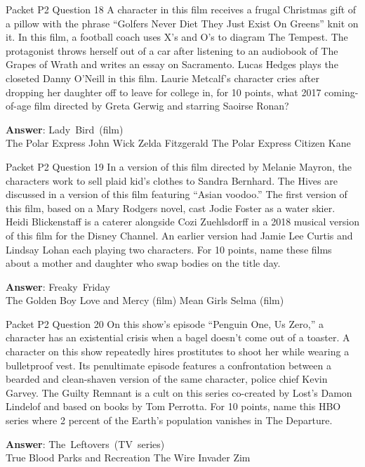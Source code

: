 \begin{frame}{Packet P2 Question 18}
A character in this film receives a frugal Christmas gift of a   pillow with the phrase ``Golfers Never Diet They Just Exist On Greens'' knit on it. In this film, a football coach uses X's and O's to diagram The Tempest. The protagonist throws herself out of a car after listening to an audiobook of The Grapes of Wrath and writes an essay on Sacramento. Lucas Hedges plays the closeted Danny O’Neill in this film. Laurie Metcalf’s character cries after dropping her daughter off to leave for college in, for 10 points, what 2017 coming-of-age film directed by Greta Gerwig and starring Saoirse Ronan?        

\textbf{Answer}: Lady\ Bird\ (film)\\
 The Polar Express
 John Wick
 Zelda Fitzgerald
 The Polar Express
 Citizen Kane
\end{frame}

\begin{frame}{Packet P2 Question 19}
In a version of this film directed by Melanie Mayron, the characters work to sell plaid kid’s clothes to Sandra Bernhard. The Hives are discussed in a version of this film featuring “Asian voodoo.” The first version of this film, based on a Mary Rodgers novel, cast Jodie Foster as a water skier. Heidi Blickenstaff is a caterer alongside Cozi Zuehlsdorff in a 2018 musical version of this film for the Disney Channel. An earlier version had Jamie Lee Curtis and Lindsay Lohan each playing two characters. For 10 points, name these films about a mother and daughter who swap bodies on the title day.        

\textbf{Answer}: Freaky\ Friday\\
 The Golden Boy
 Love and Mercy (film)
 Mean Girls
 Selma (film)
\end{frame}

\begin{frame}{Packet P2 Question 20}
On this show’s episode “Penguin One, Us Zero,” a character has an existential crisis when a bagel doesn’t come out of a toaster. A character on this show repeatedly hires prostitutes to shoot her while wearing a bulletproof vest. Its penultimate episode features a confrontation between a bearded and clean-shaven version of the same character, police chief Kevin Garvey. The Guilty Remnant is a cult on this series co-created by Lost's Damon Lindelof and based on books by Tom Perrotta. For 10 points, name this HBO series where 2 percent of the Earth's population vanishes in The Departure.        

\textbf{Answer}: The\ Leftovers\ (TV\ series)\\
 True Blood
 Parks and Recreation
 The Wire
 Invader Zim
\end{frame}

